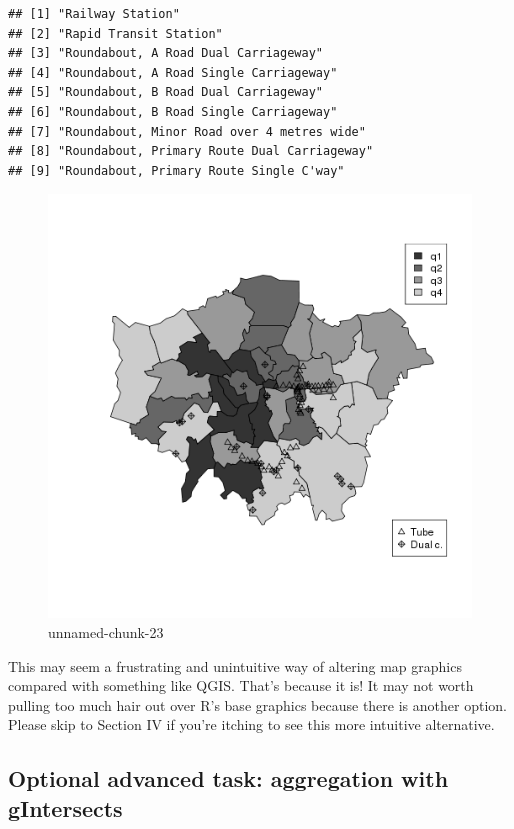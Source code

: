 \documentclass[]{article}
\begin{document}
\begin{verbatim}
## [1] "Railway Station"                           
## [2] "Rapid Transit Station"                     
## [3] "Roundabout, A Road Dual Carriageway"       
## [4] "Roundabout, A Road Single Carriageway"     
## [5] "Roundabout, B Road Dual Carriageway"       
## [6] "Roundabout, B Road Single Carriageway"     
## [7] "Roundabout, Minor Road over 4 metres wide" 
## [8] "Roundabout, Primary Route Dual Carriageway"
## [9] "Roundabout, Primary Route Single C'way"
\end{verbatim}

\begin{figure}[htbp]
\centering
\includegraphics{figure/unnamed-chunk-23.png}
\caption{unnamed-chunk-23}
\end{figure}

This may seem a frustrating and unintuitive way of altering map graphics
compared with something like QGIS. That's because it is! It may not
worth pulling too much hair out over R's base graphics because there is
another option. Please skip to Section IV if you're itching to see this
more intuitive alternative.

\subsection{Optional advanced task: aggregation with
gIntersects}\label{optional-advanced-task-aggregation-with-gintersects}
\end{document}
